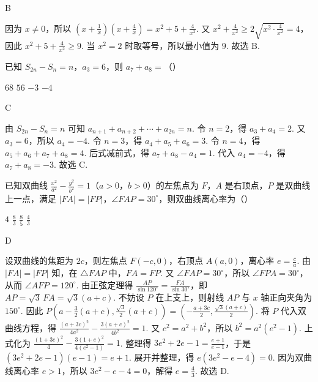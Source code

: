 \begin{answer}
B
\end{answer}

\begin{solution}
因为 \(x\ne 0\)，所以 \(\left( x+\frac{1}{x} \right)\left( x+\frac{4}{x} \right)=x^2+5+\frac{4}{x^2}\). 又 \(x^2+\frac{4}{x^2}\ge 2\sqrt{x^2\cdot \frac{4}{x^2}}=4\)，因此 \(x^2+5+\frac{4}{x^2}\ge 9\).
当 \(x^2=2\) 时取等号，所以最小值为 \(9\).
故选 B.
\end{solution}

\begin{problem}
已知 \(S_{2n}-S_n=n\)，\(a_3=6\)，则 \(a_7+a_8=\)（\quad）

\choices
    {\(68\)}
    {\(56\)}
    {\(-3\)}
    {\(-4\)}
\end{problem}

\begin{answer}
C
\end{answer}

\begin{solution}
由 \(S_{2n}-S_n=n\) 可知 \(a_{n+1}+a_{n+2}+\cdots +a_{2n}=n\).
令 \(n=2\)，得 \(a_3+a_4=2\). 又 \(a_3=6\)，所以 \(a_4=-4\).
令 \(n=3\)，得 \(a_4+a_5+a_6=3\).
令 \(n=4\)，得 \(a_5+a_6+a_7+a_8=4\).
后式减前式，得 \(a_7+a_8-a_4=1\). 代入 \(a_4=-4\)，得 \(a_7+a_8=-3\).
故选 C.
\end{solution}

\begin{problem}
已知双曲线 \(\frac{x^2}{a^2}-\frac{y^2}{b^2}=1\)（\(a>0\)，\(b>0\)）的左焦点为 \(F\)，\(A\) 是右顶点，\(P\) 是双曲线上一点，满足 \(|FA|=|FP|\)，\(\angle FAP=30^\circ\)，则双曲线离心率为（\quad）

\choices
    {\(4\)}
    {\(\frac{8}{3}\)}
    {\(\frac{8}{5}\)}
    {\(\frac{4}{3}\)}
\end{problem}

\begin{answer}
D
\end{answer}

\begin{solution}
设双曲线的焦距为 \(2c\)，则左焦点 \(F\left( -c,0 \right)\)，右顶点 \(A\left( a,0 \right)\)，离心率 \(e=\frac{c}{a}\).
由 \(|FA|=|FP|\) 知，在 \(\triangle FAP\) 中，\(FA=FP\). 又 \(\angle FAP=30^\circ\)，所以 \(\angle FPA=30^\circ\)，从而 \(\angle AFP=120^\circ\). 由正弦定理得 \(\frac{AP}{\sin 120^\circ}=\frac{FA}{\sin 30^\circ}\)，即 \(AP=\sqrt{3}\,FA=\sqrt{3}\left( a+c \right)\).
不妨设 \(P\) 在上支上，则射线 \(AP\) 与 \(x\) 轴正向夹角为 \(150^\circ\). 因此 \(P\left( a-\frac{3}{2}\left( a+c \right),\frac{\sqrt{3}}{2}\left( a+c \right) \right)=\left( -\frac{a+3c}{2},\frac{\sqrt{3}\left( a+c \right)}{2} \right)\).
将 \(P\) 代入双曲线方程，得 \(\frac{\left( a+3c \right)^2}{4a^2}-\frac{3\left( a+c \right)^2}{4b^2}=1\). 又 \(c^2=a^2+b^2\)，所以 \(b^2=a^2\left( e^2-1 \right)\). 上式化为 \(\frac{\left( 1+3e \right)^2}{4}-\frac{3\left( 1+e \right)^2}{4\left( e^2-1 \right)}=1\). 整理得 \(3e^2+2e-1=\frac{e+1}{e-1}\)，于是 \(\left( 3e^2+2e-1 \right)\left( e-1 \right)=e+1\). 展开并整理，得 \(e\left( 3e^2-e-4 \right)=0\). 因为双曲线离心率 \(e>1\)，所以 \(3e^2-e-4=0\)，解得 \(e=\frac{4}{3}\).
故选 D.
\end{solution}
